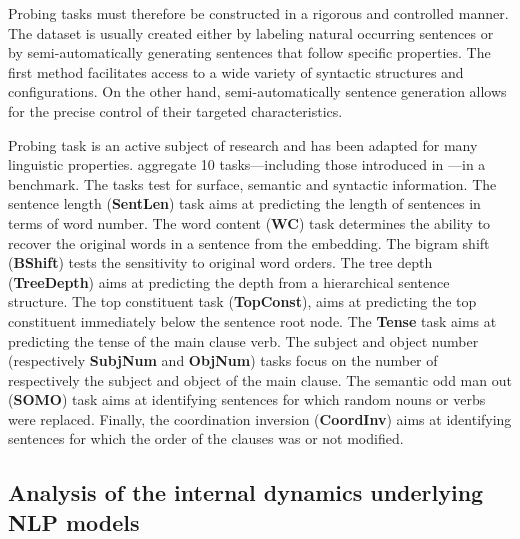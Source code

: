 Probing tasks must therefore be constructed in a rigorous and controlled manner. The dataset is usually created either by labeling natural occurring sentences or by semi-automatically generating sentences that follow specific properties. The first method facilitates access to a wide variety of syntactic structures and configurations. On the other hand, semi-automatically sentence generation allows for the precise control of their targeted characteristics.


Probing task is an active subject of research and has been adapted for many linguistic properties.\textcite{baroni_18} aggregate 10 tasks—including those introduced in \textcite{adi_17}—in a benchmark. The tasks test for surface, semantic and syntactic information. The sentence length (\textbf{SentLen}) task aims at predicting the length of sentences in terms of word number. The word content (\textbf{WC}) task determines the ability to recover the original words in a sentence from the embedding. The bigram shift (\textbf{BShift}) tests the sensitivity to original word orders. The tree depth (\textbf{TreeDepth}) aims at predicting the depth from a hierarchical sentence structure. The top constituent task (\textbf{TopConst}), aims at predicting the top constituent immediately below the sentence root node. The \textbf{Tense} task aims at predicting the tense of the main clause verb. The subject and object number (respectively \textbf{SubjNum} and \textbf{ObjNum}) tasks focus on the number of respectively the subject and object of the main clause. The semantic odd man out (\textbf{SOMO}) task aims at identifying sentences for which random nouns or verbs were replaced. Finally, the coordination inversion (\textbf{CoordInv}) aims at identifying sentences for which the order of the clauses was or not modified.






\subsection{Analysis of the internal dynamics underlying NLP models}

